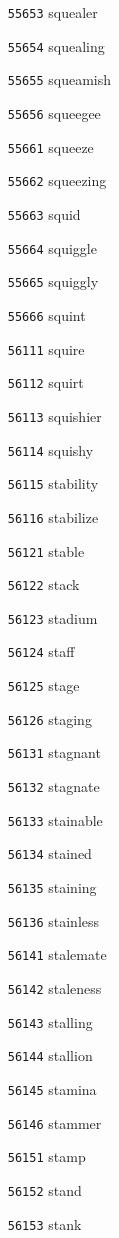 \documentclass[twoside,11pt]{article}
\begin{document}
\begin{multicols}{5}
\begin{enumerate}
\item[\texttt{55653}] squealer
\item[\texttt{55654}] squealing
\item[\texttt{55655}] squeamish
\item[\texttt{55656}] squeegee
\item[\texttt{55661}] squeeze
\item[\texttt{55662}] squeezing
\item[\texttt{55663}] squid
\item[\texttt{55664}] squiggle
\item[\texttt{55665}] squiggly
\item[\texttt{55666}] squint
\item[\texttt{56111}] squire
\item[\texttt{56112}] squirt
\item[\texttt{56113}] squishier
\item[\texttt{56114}] squishy
\item[\texttt{56115}] stability
\item[\texttt{56116}] stabilize
\item[\texttt{56121}] stable
\item[\texttt{56122}] stack
\item[\texttt{56123}] stadium
\item[\texttt{56124}] staff
\item[\texttt{56125}] stage
\item[\texttt{56126}] staging
\item[\texttt{56131}] stagnant
\item[\texttt{56132}] stagnate
\item[\texttt{56133}] stainable
\item[\texttt{56134}] stained
\item[\texttt{56135}] staining
\item[\texttt{56136}] stainless
\item[\texttt{56141}] stalemate
\item[\texttt{56142}] staleness
\item[\texttt{56143}] stalling
\item[\texttt{56144}] stallion
\item[\texttt{56145}] stamina
\item[\texttt{56146}] stammer
\item[\texttt{56151}] stamp
\item[\texttt{56152}] stand
\item[\texttt{56153}] stank

\end{enumerate}
\end{multicols}
\end{document}
